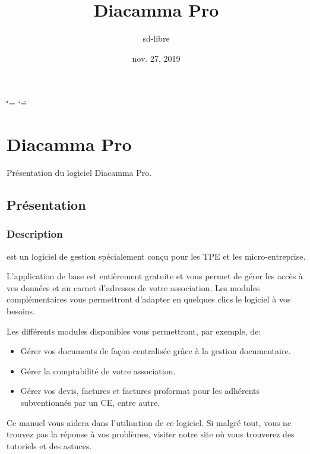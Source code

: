 \documentclass[a4paper,10pt,oneside,french]{sphinxmanual}
\title{Diacamma Pro}
\date{nov. 27, 2019}
\author{sd-libre}
\begin{document}
\ifdefined\shorthandoff
  \ifnum\catcode`\=\string=\active\shorthandoff{=}\fi
  \ifnum\catcode`\"=\active{}\fi
\fi

\pagestyle{empty}
\sphinxmaketitle
\pagestyle{plain}
\sphinxtableofcontents
\pagestyle{normal}
\label{\detokenize{index::doc}}



\chapter{Diacamma Pro}
\label{\detokenize{pro/index:diacamma-pro}}\label{\detokenize{pro/index::doc}}
Présentation du logiciel Diacamma Pro.


\section{Présentation}
\label{\detokenize{pro/presentation:presentation}}\label{\detokenize{pro/presentation::doc}}

\subsection{Description}
\label{\detokenize{pro/presentation:description}}
 est un logiciel de gestion spécialement conçu pour les TPE et les micro-entreprise.

L’application de base est entièrement gratuite et vous permet de gérer les accès à vos données et au carnet d’adresses de votre association. Les modules complémentaires vous permettront d’adapter en quelques clics le logiciel à vos besoins.

Les différents modules disponibles vous permettront, par exemple, de:
\begin{itemize}
\item {} 
Gérer vos documents de façon centralisée grâce à la gestion documentaire.

\item {} 
Gérer la comptabilité de votre association.

\item {} 
Gérer vos devis, factures et factures proformat pour les adhérents subventionnés par un CE, entre autre.

\end{itemize}

Ce manuel vous aidera dans l’utilisation de ce logiciel.
Si malgré tout, vous ne trouvez pas la réponse à vos problèmes, visiter notre site  où vous trouverez des tutoriels et des astuces.
\end{document}
